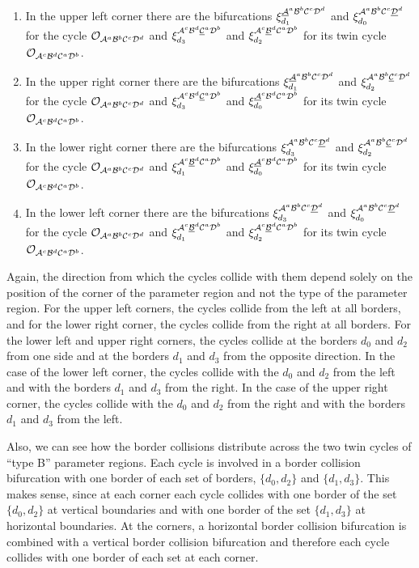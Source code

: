 \begin{enumerate}
	\item In the upper left corner there are the bifurcations $\xi_{d_1}^{\underline{\mathcal{A}}^a\mathcal{B}^b\mathcal{C}^c\mathcal{D}^d}$ and $\xi_{d_0}^{\mathcal{A}^a\mathcal{B}^b\mathcal{C}^c\underline{\mathcal{D}}^d}$ for the cycle $\mathcal{O}_{\mathcal{A}^a\mathcal{B}^b\mathcal{C}^c\mathcal{D}^d}$ and $\xi_{d_3}^{\mathcal{A}^c\mathcal{B}^d\underline{\mathcal{C}}^a\mathcal{D}^b}$ and $\xi_{d_2}^{\mathcal{A}^c\underline{\mathcal{B}}^d\mathcal{C}^a\mathcal{D}^b}$ for its twin cycle $\mathcal{O}_{\mathcal{A}^c\mathcal{B}^d\mathcal{C}^a\mathcal{D}^b}$.
	\item In the upper right corner there are the bifurcations $\xi_{d_1}^{\underline{\mathcal{A}}^a\mathcal{B}^b\mathcal{C}^c\mathcal{D}^d}$ and $\xi_{d_2}^{\mathcal{A}^a\mathcal{B}^b\underline{\mathcal{C}}^c\mathcal{D}^d}$ for the cycle $\mathcal{O}_{\mathcal{A}^a\mathcal{B}^b\mathcal{C}^c\mathcal{D}^d}$ and $\xi_{d_3}^{\mathcal{A}^c\mathcal{B}^d\underline{\mathcal{C}}^a\mathcal{D}^b}$ and $\xi_{d_0}^{\underline{\mathcal{A}}^c\mathcal{B}^d\mathcal{C}^a\mathcal{D}^b}$ for its twin cycle $\mathcal{O}_{\mathcal{A}^c\mathcal{B}^d\mathcal{C}^a\mathcal{D}^b}$.
	\item In the lower right corner there are the bifurcations $\xi_{d_3}^{\mathcal{A}^a\mathcal{B}^b\mathcal{C}^c\underline{\mathcal{D}}^d}$ and $\xi_{d_2}^{\mathcal{A}^a\mathcal{B}^b\underline{\mathcal{C}}^c\mathcal{D}^d}$ for the cycle $\mathcal{O}_{\mathcal{A}^a\mathcal{B}^b\mathcal{C}^c\mathcal{D}^d}$ and $\xi_{d_1}^{\mathcal{A}^c\underline{\mathcal{B}}^d\mathcal{C}^a\mathcal{D}^b}$ and $\xi_{d_0}^{\underline{\mathcal{A}}^c\mathcal{B}^d\mathcal{C}^a\mathcal{D}^b}$ for its twin cycle $\mathcal{O}_{\mathcal{A}^c\mathcal{B}^d\mathcal{C}^a\mathcal{D}^b}$.
	\item In the lower left corner there are the bifurcations $\xi_{d_3}^{\mathcal{A}^a\mathcal{B}^b\mathcal{C}^c\underline{\mathcal{D}}^d}$ and $\xi_{d_0}^{\mathcal{A}^a\mathcal{B}^b\mathcal{C}^c\underline{\mathcal{D}}^d}$ for the cycle $\mathcal{O}_{\mathcal{A}^a\mathcal{B}^b\mathcal{C}^c\mathcal{D}^d}$ and $\xi_{d_1}^{\mathcal{A}^c\underline{\mathcal{B}}^d\mathcal{C}^a\mathcal{D}^b}$ and $\xi_{d_2}^{\mathcal{A}^c\underline{\mathcal{B}}^d\mathcal{C}^a\mathcal{D}^b}$ for its twin cycle $\mathcal{O}_{\mathcal{A}^c\mathcal{B}^d\mathcal{C}^a\mathcal{D}^b}$.
\end{enumerate}

Again, the direction from which the cycles collide with them depend solely on the position of the corner of the parameter region and not the type of the parameter region.
For the upper left corners, the cycles collide from the left at all borders, and for the lower right corner, the cycles collide from the right at all borders.
For the lower left and upper right corners, the cycles collide at the borders $d_0$ and $d_2$ from one side and at the borders $d_1$ and $d_3$ from the opposite direction.
In the case of the lower left corner, the cycles collide with the $d_0$ and $d_2$ from the left and with the borders $d_1$ and $d_3$ from the right.
In the case of the upper right corner, the cycles collide with the $d_0$ and $d_2$ from the right and with the borders $d_1$ and $d_3$ from the left.

Also, we can see how the border collisions distribute across the two twin cycles of ``type B'' parameter regions.
Each cycle is involved in a border collision bifurcation with one border of each set of borders, $\{d_0, d_2\}$ and $\{d_1, d_3\}$.
This makes sense, since at each corner each cycle collides with one border of the set $\{d_0, d_2\}$ at vertical boundaries and with one border of the set $\{d_1, d_3\}$ at horizontal boundaries.
At the corners, a horizontal border collision bifurcation is combined with a vertical border collision bifurcation and therefore each cycle collides with one border of each set at each corner.
